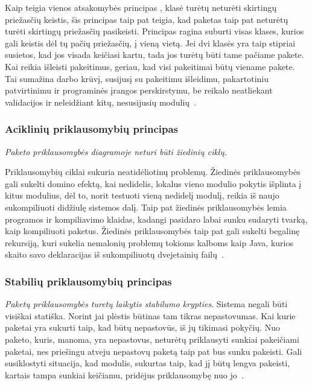 Kaip teigia vienos atsakomybės principas , klasė turėtų neturėti skirtingų priežasčių keistis,
šis principas taip pat teigia, kad paketas taip pat neturėtų turėti skirtingų priežasčių pasikeisti.
Principas ragina suburti visas klases, kurios gali keistis dėl tų pačių priežasčių, į vieną vietą.
Jei dvi klasės yra taip stipriai susietos, kad jos visada keičiasi kartu, tada
jos turėtų būti tame pačiame pakete.
Kai reikia išleisti pakeitimus, geriau, kad visi pakeitimai būtų viename pakete.
Tai sumažina darbo krūvį, susijusį su pakeitimu išleidimu, pakartotiniu patvirtinimu ir programinės įrangos perskirstymu,
be reikalo neatliekant validacijos ir neleidžiant kitų, nesusijusių modulių~\cite{AgileSoftwareDevelopment}.

\subsubsection{Aciklinių priklausomybių principas}
\textit{Paketo priklausomybės diagramoje neturi būti žiedinių ciklų.}

Priklausomybių ciklai sukuria neatidėliotinų problemų.
Žiedinės priklausomybės gali sukelti domino efektą, kai nedidelis, lokalus vieno modulio pokytis išplinta į kitus modulius,
dėl to, norit testuoti vieną nedidelį modulį, reikia iš naujo sukompiliuoti didžiulę sistemos dalį.
Taip pat žiedinės priklausomybės lemia programos ir kompiliavimo klaidas, kadangi pasidaro labai sunku sudaryti tvarką, kaip kompiliuoti paketus.
Žiedinės priklausomybės taip pat gali sukelti begalinę rekursiją,
kuri sukelia nemalonių problemų tokioms kalboms kaip Java, kurios skaito savo deklaracijas iš
sukompiliuotų dvejetainių failų~\cite{AgileSoftwareDevelopment}.


\subsubsection{Stabilių priklausomybių principas}
\textit{Paketų priklausomybės turetų laikytis stabilumo krypties}.
Sistema negali būti visiškai statiška.
Norint jai plėstis būtinas tam tikras nepastovumas.
Kai kurie paketai yra sukurti taip, kad būtų nepastovūs, iš jų tikimasi pokyčių.
Nuo paketo, kuris, manoma, yra nepastovus, neturėtų priklausyti sunkiai pakeičiami paketai,
nes priešingu atveju nepastovų paketą taip pat bus sunku pakeisti.
Gali susiklostyti situacija, kad modulis, sukurtas taip, kad jį būtų lengva pakeisti, kartais tampa sunkiai keičiamu,
 pridėjus priklausomybę nuo jo~\cite{AgileSoftwareDevelopment}.


